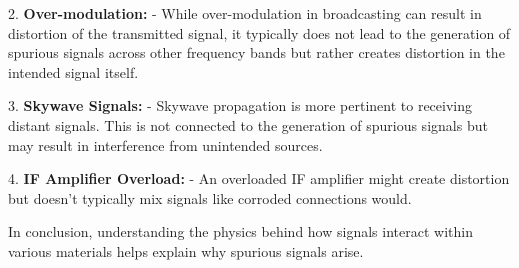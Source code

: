 2. \textbf{Over-modulation:}
   - While over-modulation in broadcasting can result in distortion of the transmitted signal, it typically does not lead to the generation of spurious signals across other frequency bands but rather creates distortion in the intended signal itself.

3. \textbf{Skywave Signals:}
   - Skywave propagation is more pertinent to receiving distant signals. This is not connected to the generation of spurious signals but may result in interference from unintended sources.

4. \textbf{IF Amplifier Overload:}
   - An overloaded IF amplifier might create distortion but doesn’t typically mix signals like corroded connections would.

In conclusion, understanding the physics behind how signals interact within various materials helps explain why spurious signals arise. 

